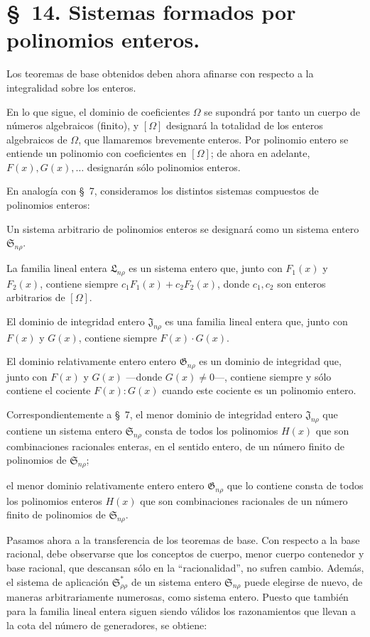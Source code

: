 \documentclass[11pt]{article}
\providecommand{\Ssys}{\mathfrak{S}}
\providecommand{\Lsys}{\mathfrak{L}}
\providecommand{\Jdom}{\mathfrak{J}}
\providecommand{\Gdom}{\mathfrak{G}}
\begin{document}
\section*{\S\ 14. Sistemas formados por polinomios enteros.}

Los teoremas de base obtenidos deben ahora afinarse con respecto a la integralidad sobre los enteros.

En lo que sigue, el dominio de coeficientes $\Omega$ se supondrá por tanto un cuerpo de números algebraicos (finito), y $[\Omega]$ designará la totalidad de los enteros algebraicos de $\Omega$, que llamaremos brevemente enteros. Por polinomio entero se entiende un polinomio con coeficientes en $[\Omega]$; de ahora en adelante, $F(x),G(x),\ldots$ designarán sólo polinomios enteros.

En analogía con \S\ 7, consideramos los distintos sistemas compuestos de polinomios enteros:

Un sistema arbitrario de polinomios enteros se designará como un sistema entero $\Ssys_{n\rho}$.

La familia lineal entera $\Lsys_{n\rho}$ es un sistema entero que, junto con $F_1(x)$ y $F_2(x)$, contiene siempre $c_1F_1(x)+c_2F_2(x)$, donde $c_1,c_2$ son enteros arbitrarios de $[\Omega]$.

El dominio de integridad entero $\Jdom_{n\rho}$ es una familia lineal entera que, junto con $F(x)$ y $G(x)$, contiene siempre $F(x)\cdot G(x)$.

El dominio relativamente entero entero $\Gdom_{n\rho}$ es un dominio de integridad que, junto con $F(x)$ y $G(x)$ ---donde $G(x)\ne0$---, contiene siempre y sólo contiene el cociente $F(x):G(x)$ cuando este cociente es un polinomio entero.

Correspondientemente a \S\ 7, el menor dominio de integridad entero $\Jdom_{n\rho}$ que contiene un sistema entero $\Ssys_{n\rho}$ consta de todos los polinomios $H(x)$ que son combinaciones racionales enteras, en el sentido entero, de un número finito de polinomios de $\Ssys_{n\rho}$;

el menor dominio relativamente entero entero $\Gdom_{n\rho}$ que lo contiene consta de todos los polinomios enteros $H(x)$ que son combinaciones racionales de un número finito de polinomios de $\Ssys_{n\rho}$.

Pasamos ahora a la transferencia de los teoremas de base. Con respecto a la base racional, debe observarse que los conceptos de cuerpo, menor cuerpo contenedor y base racional, que descansan sólo en la ``racionalidad'', no sufren cambio. Además, el sistema de aplicación $\Ssys^*_{\rho\rho}$ de un sistema entero $\Ssys_{n\rho}$ puede elegirse de nuevo, de maneras arbitrariamente numerosas, como sistema entero. Puesto que también para la familia lineal entera siguen siendo válidos los razonamientos que llevan a la cota del número de generadores, se obtiene:
\end{document}
